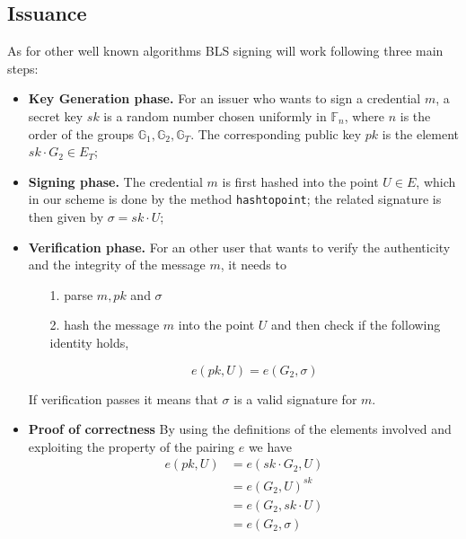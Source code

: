 \subsection{Issuance} \label{issuance}

As for other well known algorithms BLS signing will work following
three main steps:
\begin{itemize}

\item \textbf{Key Generation phase.} For an issuer who wants to sign
  a credential $m$, a secret key $sk$ is a random number chosen
  uniformly in $\mathbb{F}_n$, where $n$ is the order of the
  groups $\mathbb{G}_1, \mathbb{G}_2, \mathbb{G}_T$. The
  corresponding public key $pk$ is the element $sk\cdot G_2\in
  E_T$;

\item \textbf{Signing phase.} The credential $m$ is first hashed into
  the point $U\in E$, which in our scheme is done by the method
  \verb!hashtopoint!; the related signature is then given by $\sigma =
  sk\cdot U$;

\item \textbf{Verification phase.} For an other user that wants to
  verify the authenticity and the integrity of the message $m$, it
  needs to

  \begin{itemize}

  \item [1.] parse $m, pk$ and $\sigma$

  \item [2.] hash the message $m$ into the point $U$ and then
    check if the following identity holds,

    \[
    e(pk,U) = e(G_2,\sigma)
    \]

  \end{itemize}
If verification passes it means that $\sigma$ is a valid signature for
$m$.
\item \textbf{Proof of correctness} By using the definitions of the elements involved and exploiting the property of the pairing $e$ we have
\[
\begin{split}
    e(pk,U) &= e(sk\cdot G_2, U) \\
            &= e(G_2,U)^{sk}\\
            &= e(G_2,sk\cdot U)\\
            &= e(G_2,\sigma)
\end{split}
\]

\end{itemize}

